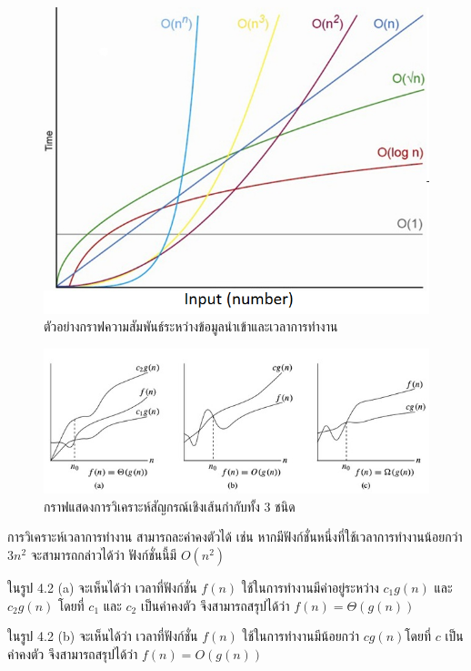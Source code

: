 \begin{figure}[h!]
    \centering
    \includegraphics[width=13cm]{images/time_complex_graph}
    \caption{ตัวอย่างกราฟความสัมพันธ์ระหว่างข้อมูลนำเข้าและเวลาการทำงาน}
    \label{fig:time-complex-graph}
\end{figure}

\begin{figure}[h!]
    \centering
    \includegraphics[width=13cm]{images/graph_3_cases}
    \caption{กราฟแสดงการวิเคราะห์สัญกรณ์เชิงเส้นกำกับทั้ง 3 ชนิด}
    \label{fig:graph-3-cases}
\end{figure}

การวิเคราะห์เวลาการทำงาน สามารถละค่าคงตัวได้ เช่น หากมีฟังก์ชั่นหนึ่งที่ใช้เวลาการทำงานน้อยกว่า $3n^2$ จะสามารถกล่าวได้ว่า ฟังก์ชั่นนี้มี $O(n^2)$

ในรูป 4.2 (a) จะเห็นได้ว่า เวลาที่ฟังก์ชั่น $f(n)$ ใช้ในการทำงานมีค่าอยู่ระหว่าง $c_1g(n)$ และ $c_2g(n)$ โดยที่ $c_1$ และ $c_2$ เป็นค่าคงตัว จึงสามารถสรุปได้ว่า $f(n)=\Theta(g(n))$

ในรูป 4.2 (b) จะเห็นได้ว่า เวลาที่ฟังก์ชั่น $f(n)$ ใช้ในการทำงานมีน้อยกว่า $cg(n)$โดยที่ $c$ เป็นค่าคงตัว จึงสามารถสรุปได้ว่า $f(n)=O(g(n))$

